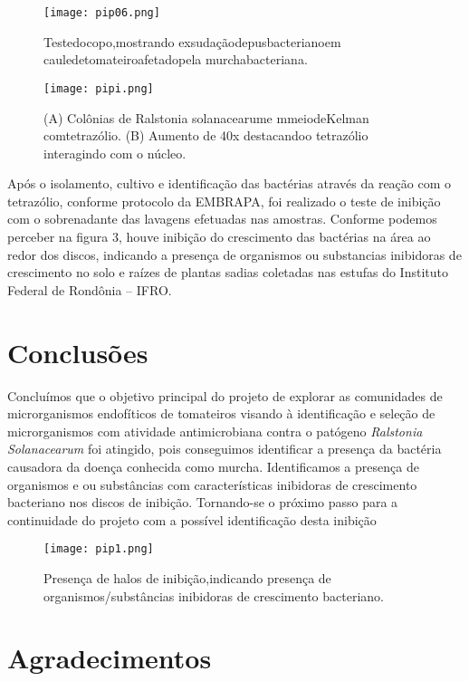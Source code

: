 \documentclass[article,12pt,onesidea,4paper,english,brazil]{abntex2}
\begin{document}
\begin{figure}[h]
	\centering
	\texttt{[image: pip06.png]}
	\caption{Testedocopo,mostrando exsudaçãodepusbacterianoem cauledetomateiroafetadopela murchabacteriana.}
	\label{fig:Rotulo}
\end{figure}

\begin{figure}[h]
	\centering
	\texttt{[image: pipi.png]}
	\caption{(A) Colônias de Ralstonia solanacearume mmeiodeKelman comtetrazólio. (B) Aumento de 40x destacandoo tetrazólio interagindo com o núcleo.}
\end{figure}

Após o isolamento, cultivo e identificação das bactérias através da reação com o tetrazólio, conforme protocolo da EMBRAPA, foi realizado o teste de inibição com o sobrenadante das lavagens efetuadas nas amostras. Conforme podemos perceber na figura 3, houve inibição do crescimento das bactérias na área ao redor dos discos, indicando a presença de organismos ou substancias inibidoras de crescimento no solo e raízes de plantas sadias coletadas nas estufas do Instituto Federal de Rondônia – IFRO.
	
	\section*{Conclusões}
		
	Concluímos que o objetivo principal do projeto de explorar as comunidades de microrganismos endofíticos de tomateiros visando à identificação e seleção de microrganismos com atividade antimicrobiana contra o patógeno \textit{Ralstonia Solanacearum} foi atingido, pois conseguimos identificar a presença da bactéria causadora da doença conhecida como murcha. Identificamos a presença de organismos e ou substâncias com características inibidoras de crescimento bacteriano nos discos de inibição. Tornando-se o próximo passo para a continuidade do projeto com a possível identificação desta inibição
	
	\begin{figure}[h]
		\centering
		\texttt{[image: pip1.png]}
		\caption{Presença de halos de inibição,indicando presença de organismos/substâncias inibidoras de crescimento bacteriano.}
	\end{figure}
	
	\section*{Agradecimentos}
	
\end{document}
